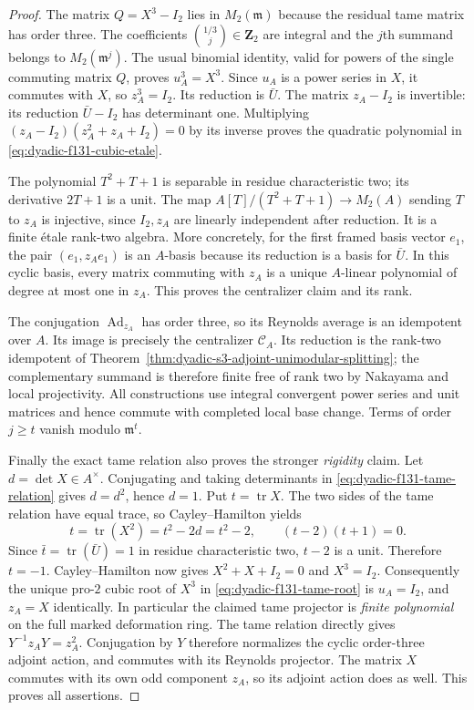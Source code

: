 \begin{proof}
The matrix $Q=X^3-I_2$ lies in
$M_2(\mathfrak m)$ because the
residual tame matrix has order
three.  The coefficients
$\binom{1/3}{j}\in\mathbf Z_2$
are integral and the $j$th
summand belongs to
$M_2(\mathfrak m^j)$.
The usual binomial identity,
valid for powers of the single
commuting matrix $Q$, proves
$u_A^3=X^3$.
Since $u_A$ is a power series
in $X$, it commutes with $X$,
so $z_A^3=I_2$.
Its reduction is $\bar U$.
The matrix $z_A-I_2$ is invertible:
its reduction $\bar U-I_2$
has determinant one.
Multiplying
$(z_A-I_2)(z_A^2+z_A+I_2)=0$
by its inverse proves the
quadratic polynomial in
\eqref{eq:dyadic-f131-cubic-etale}.

The polynomial $T^2+T+1$
is separable in residue
characteristic two; its
derivative $2T+1$ is a unit.
The map
$A[T]/(T^2+T+1)\to M_2(A)$
sending $T$ to $z_A$
is injective, since
$I_2,z_A$ are linearly
independent after reduction.
It is a finite étale rank-two
algebra.
More concretely, for the
first framed basis vector $e_1$,
the pair $(e_1,z_A e_1)$
is an $A$-basis because its
reduction is a basis for
$\bar U$.  In this cyclic basis,
every matrix commuting with $z_A$
is a unique $A$-linear
polynomial of degree at most
one in $z_A$.
This proves the centralizer
claim and its rank.

The conjugation
$\operatorname{Ad}_{z_A}$
has order three, so its
Reynolds average is an
idempotent over $A$.
Its image is precisely the
centralizer $\mathcal C_A$.
Its reduction is the rank-two
idempotent of
Theorem~\ref{thm:dyadic-s3-adjoint-unimodular-splitting};
the complementary summand is
therefore finite free of rank
two by Nakayama and local
projectivity.
All constructions use integral
convergent power series and
unit matrices and hence commute
with completed local base
change.  Terms of order
$j\ge t$ vanish modulo
$\mathfrak m^t$.

Finally the exact tame relation
also proves the stronger
\emph{rigidity} claim.
Let $d=\det X\in A^\times$.
Conjugating and taking
determinants in
\eqref{eq:dyadic-f131-tame-relation}
gives $d=d^2$, hence $d=1$.
Put $t=\operatorname{tr}X$.
The two sides of the tame
relation have equal trace,
so Cayley--Hamilton yields
\[
t=\operatorname{tr}(X^2)=t^2-2d=t^2-2,
\qquad (t-2)(t+1)=0.
\]
Since $\bar t=\operatorname{tr}(\bar U)=1$
in residue characteristic two,
$t-2$ is a unit.
Therefore $t=-1$.
Cayley--Hamilton now gives
$X^2+X+I_2=0$ and $X^3=I_2$.
Consequently the unique
pro-$2$ cubic root of $X^3$
in \eqref{eq:dyadic-f131-tame-root}
is $u_A=I_2$, and
$z_A=X$ identically.
In particular the claimed
tame projector is \emph{finite
polynomial} on the full
marked deformation ring.
The tame relation directly gives
$Y^{-1}z_A Y=z_A^2$.
Conjugation by $Y$ therefore
normalizes the cyclic
order-three adjoint action,
and commutes with its
Reynolds projector.
The matrix $X$ commutes with
its own odd component $z_A$,
so its adjoint action does as
well.  This proves all
assertions.
\end{proof}

